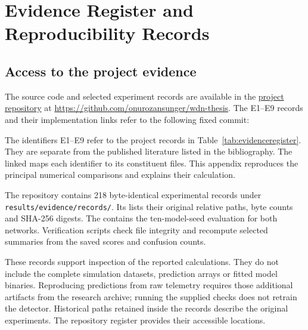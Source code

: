 \chapter{Evidence Register and Reproducibility Records}
\label{app:evidence}

\section{Access to the project evidence}
The source code and selected experiment records are available in the \href{\repourl/tree/\repocommit}{project repository} at \url{https://github.com/onurozansunger/wdn-thesis}. The E1--E9 records and their implementation links refer to the following fixed commit:
\begin{center}\small\texttt{\repocommit}\end{center}
The identifiers E1--E9 refer to the project records in Table~\ref{tab:evidenceregister}. They are separate from the published literature listed in the bibliography. The linked  maps each identifier to its constituent files. This appendix reproduces the principal numerical comparisons and explains their calculation.

The repository contains 218 byte-identical experimental records under \texttt{results/evidence/records/}. Its  lists their original relative paths, byte counts and SHA-256 digests. The  contains the ten-model-seed evaluation for both networks. Verification scripts check file integrity and recompute selected summaries from the saved scores and confusion counts.

These records support inspection of the reported calculations. They do not include the complete simulation datasets, prediction arrays or fitted model binaries. Reproducing predictions from raw telemetry requires those additional artifacts from the research archive; running the supplied checks does not retrain the detector. Historical paths retained inside the records describe the original experiments. The repository register provides their accessible locations.

